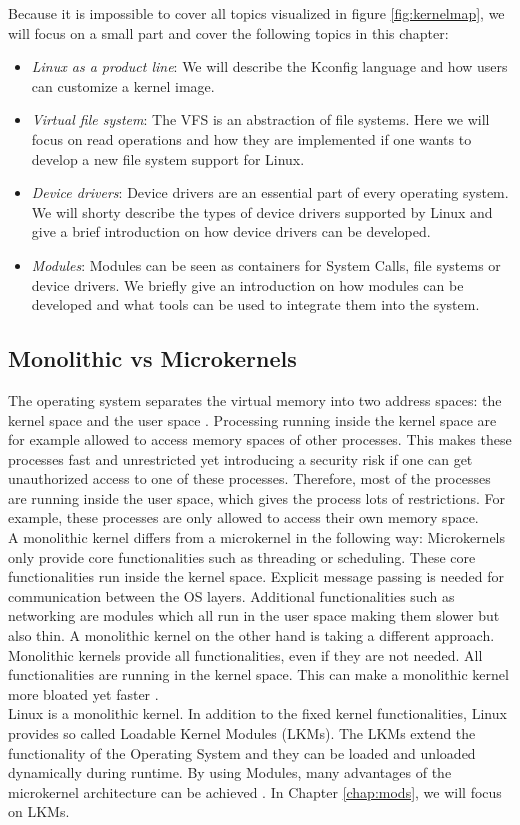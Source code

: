\documentclass{sig-alternate-05-2015}
\begin{document}
Because it is impossible to cover all topics visualized in figure \ref{fig:kernelmap}, we will focus on a small part and cover the following topics in this chapter:
\begin{itemize}
\item \emph{Linux as a product line}: We will describe the Kconfig language and how users can customize a kernel image.
\item \emph{Virtual file system}: The VFS is an abstraction of file systems. Here we will focus on read operations and how they are implemented if one wants to develop a new file system support for Linux.
\item \emph{Device drivers}: Device drivers are an essential part of every operating system. We will shorty describe the types of device drivers supported by Linux and give a brief introduction on how device drivers can be developed.
\item \emph{Modules}: Modules can be seen as containers for System Calls, file systems or device drivers. We briefly give an introduction on how modules can be developed and what tools can be used to integrate them into the system.
\end{itemize}


\subsection{Monolithic vs Microkernels}
 The operating system separates the virtual memory into two address spaces: the kernel space and the user space \cite{stankov2006discussion}. Processing running inside the kernel space are for example allowed to access memory spaces of other processes. This makes these processes fast and unrestricted yet introducing a security risk if one can get unauthorized access to one of these processes. Therefore, most of the processes are running inside the user space, which gives the process lots of restrictions. For example, these processes are only allowed to access their own memory space. \\ A monolithic kernel differs from a microkernel in the following way: Microkernels only provide core functionalities such as threading or scheduling.  These core functionalities run inside the kernel space. Explicit message passing is needed for communication between the OS layers. Additional functionalities such as networking are  modules which all run in the user space making them slower but also thin.  A monolithic kernel on the other hand is taking a different approach. Monolithic kernels provide all functionalities, even if they are not needed. All functionalities are running in the kernel space. This can make a monolithic kernel more bloated yet faster . \\
Linux is a monolithic kernel. In addition to the fixed kernel functionalities, Linux provides so called Loadable Kernel Modules (LKMs). The LKMs extend the functionality of the Operating System and they can be loaded and unloaded dynamically during runtime. By using Modules,  many advantages of the microkernel architecture can be achieved \cite[pp. 11]{bovet2005understanding}. In Chapter \ref{chap:mods}, we will focus on LKMs. \\
\end{document}
